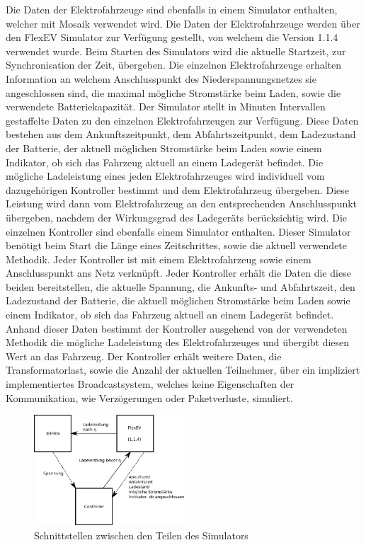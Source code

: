 Die Daten der Elektrofahrzeuge sind ebenfalls in einem Simulator enthalten, welcher mit Mosaik verwendet wird. Die Daten der Elektrofahrzeuge werden über den FlexEV Simulator zur Verfügung gestellt, von welchem die Version 1.1.4 verwendet wurde. Beim Starten des Simulators wird die aktuelle Startzeit, zur Synchronisation der Zeit, übergeben. Die einzelnen Elektrofahrzeuge erhalten Information an welchem Anschlusspunkt des Niederspannungsnetzes sie angeschlossen sind, die maximal mögliche Stromstärke beim Laden, sowie die verwendete Batteriekapazität. Der Simulator stellt in Minuten Intervallen gestaffelte Daten zu den einzelnen Elektrofahrzeugen zur Verfügung. Diese Daten bestehen aus dem Ankunftszeitpunkt, dem Abfahrtszeitpunkt, dem Ladezustand der Batterie, der aktuell möglichen Stromstärke beim Laden sowie einem Indikator, ob sich das Fahrzeug aktuell an einem Ladegerät befindet. Die mögliche Ladeleistung eines jeden Elektrofahrzeuges wird individuell vom dazugehörigen Kontroller bestimmt und dem Elektrofahrzeug übergeben. Diese Leistung wird dann vom Elektrofahrzeug an den entsprechenden Anschlusspunkt übergeben, nachdem der Wirkungsgrad des Ladegeräts berücksichtig wird.
Die einzelnen Kontroller sind ebenfalls einem Simulator enthalten. Dieser Simulator benötigt beim Start die Länge eines Zeitschrittes, sowie die aktuell verwendete Methodik. Jeder Kontroller ist mit einem Elektrofahrzeug sowie einem Anschlusspunkt ans Netz verknüpft. Jeder Kontroller erhält die Daten die diese beiden bereitstellen, die aktuelle Spannung, die Ankunfts- und Abfahrtszeit, den Ladezustand der Batterie, die aktuell möglichen Stromstärke beim Laden sowie einem Indikator, ob sich das Fahrzeug aktuell an einem Ladegerät befindet. Anhand dieser Daten bestimmt der Kontroller ausgehend von der verwendeten Methodik die mögliche Ladeleistung des Elektrofahrzeuges und übergibt diesen Wert an das Fahrzeug. Der Kontroller erhält weitere Daten, die Transformatorlast, sowie die Anzahl der aktuellen Teilnehmer, über ein impliziert implementiertes Broadcastsystem, welches keine Eigenschaften der Kommunikation, wie Verzögerungen oder Paketverluste, simuliert. 
\begin{figure}[htb]
\centering
	\includegraphics[width=0.5\textwidth]{img/SimAufbau3.png}
	\caption{Schnittstellen zwischen den Teilen des Simulators}
	\label{Abb_SimAufbau}
\end{figure}

